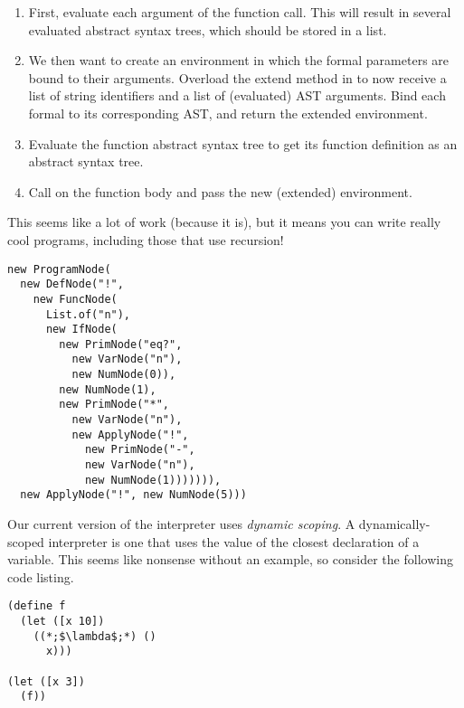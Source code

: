 \begin{enumerate}[label=(\alph*)]
  \begin{enumerate}[label=(\roman*)] 
  \item First, evaluate each argument of the function call. This will result in several evaluated abstract syntax trees, which should be stored in a list. 
  \item We then want to create an environment in which the formal parameters are bound to their arguments. Overload the extend method in  to now receive a list of string identifiers and a list of (evaluated) AST arguments. Bind each formal to its corresponding AST, and return the extended environment. 
  \item Evaluate the function abstract syntax tree to get its function definition as an abstract syntax tree.
  \item Call  on the function body and pass the new (extended) environment.
  \end{enumerate}
  This seems like a lot of work (because it is), but it means you can write really cool programs, including those that use recursion!
\begin{small}
\begin{verbatim}
new ProgramNode(
  new DefNode("!", 
    new FuncNode(
      List.of("n"),
      new IfNode(
        new PrimNode("eq?", 
          new VarNode("n"), 
          new NumNode(0)),
        new NumNode(1),
        new PrimNode("*", 
          new VarNode("n"), 
          new ApplyNode("!", 
            new PrimNode("-", 
            new VarNode("n"), 
            new NumNode(1))))))),
  new ApplyNode("!", new NumNode(5)))
\end{verbatim}
\end{small}
\end{enumerate}

\newpage %
Our current version of the interpreter uses \textit{dynamic scoping}. A dynamically-scoped interpreter is one that uses the value of the closest declaration of a variable. This seems like nonsense without an example, so consider the following code listing.
\begin{lstlisting}[language=MyScheme, frame=single]
(define f
  (let ([x 10])
    ((*;$\lambda$;*) ()
      x)))

(let ([x 3])
  (f))
\end{lstlisting}


